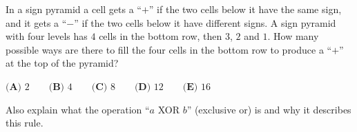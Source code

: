 In a sign pyramid a cell gets a ``$+$'' if the two cells below it have the same sign, and it gets a ``$-$'' if the two cells below it have different signs. A sign pyramid with four levels has $4$ cells in the bottom row, then $3$, $2$ and $1$. How many possible ways are there to fill the four cells in the bottom row to produce a ``$+$'' at the top of the pyramid?

$\textbf{(A) } 2 \qquad \textbf{(B) } 4 \qquad \textbf{(C) } 8 \qquad \textbf{(D) } 12 \qquad \textbf{(E) } 16$

Also explain what the operation ``$a$ XOR $b$'' (exclusive or) is and why it describes this rule.
